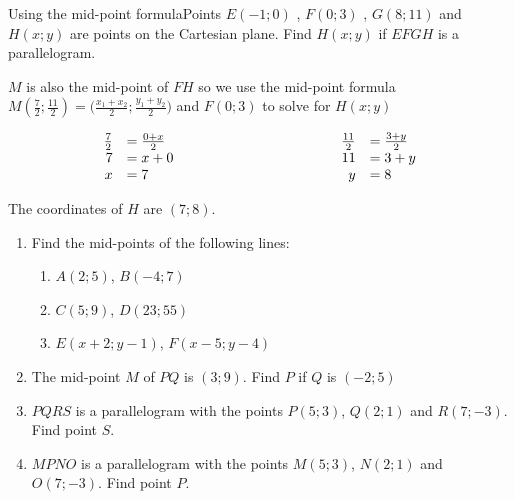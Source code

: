 \begin{wex}{Using the mid-point formula}{Points $E(-1;0)$ , $F(0;3)$ , $G(8;11)$ and $H(x;y)$ are points on the Cartesian plane. Find $H(x;y)$ if $EFGH$ is a parallelogram.}
{
$M$ is also the mid-point of $FH$ so we use the mid-point formula
$M(\frac{7}{2};\frac{11}{2}) = \Big(\frac{x_1+x_2}{2}; \frac{y_1+y_2}{2}\Big)$ and $F(0;3)$ to solve for $H(x;y)$

\begin{equation*}
\begin{array}{rllrl}
\frac{7}{2}&=\frac{0+x}{2}&\hskip10em&\frac{11}{2}&=\frac{3+y}{2}\\
7&=x+0&&11&=3+y\\
x&=7&&y&=8\\
\end{array}
\end{equation*}

The coordinates of $H$ are $(7;8)$.
}
\end{wex}
\begin{exercises}{}
\begin{enumerate}[itemsep=5pt, label=\textbf{\arabic*}. ]
\item Find the mid-points of the following lines:
  \begin{enumerate}[noitemsep, label=\textbf{(\alph*)} ]
\item $A(2;5)$, $B(-4;7)$
\item $C(5;9)$, $D(23;55)$
\item $E(x+2;y-1)$, $F(x-5;y-4)$
\end{enumerate}

\item The mid-point $M$ of $PQ$ is $(3;9)$. Find $P$ if $Q$ is $(-2;5)$
\item $PQRS$ is a parallelogram with the points $P(5;3)$, $Q(2;1)$ and $R(7;-3)$. Find point $S$.

\item $MPNO$ is a parallelogram with the points $M(5;3)$, $N(2;1)$ and $O(7;-3)$. Find point $P$.
\end{enumerate}
\end{exercises}    

